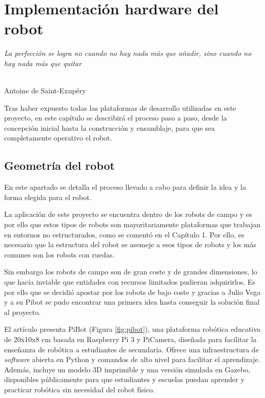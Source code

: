 \chapter{Implementación hardware del robot}
\label{cap:capitulo5}

\begin{flushright}
\begin{minipage}[]{10cm}
\emph{La perfección se logra no cuando no hay nada más que añadir, sino cuando no hay nada más que quitar}\\
\end{minipage}\\

Antoine de Saint-Exupéry\\
\end{flushright}

\vspace{1cm}

Tras haber expuesto todas las plataformas de desarrollo utilizadas en este proyecto, en este capítulo se describirá el proceso paso a paso, desde la concepción inicial hasta la construcción y ensamblaje, para que sea completamente operativo el robot.

\section{Geometría del robot}

En este apartado se detalla el proceso llevado a cabo para definir la idea y la forma elegida para el robot.

La aplicación de este proyecto se encuentra dentro de los robots de campo y es por ello que estos tipos de robots son mayoritariamente plataformas que trabajan en entornos no estructurados, como se comentó en el Capítulo 1. Por ello, es necesario que la estructura del robot se asemeje a esos tipos de robots y los más comunes son los robots con ruedas. 

Sin embargo los robots de campo son de gran coste y de grandes dimensiones, lo que hacía inviable que entidades con recursos limitados pudieran adquirirlos. Es por ello que se decidió apostar por los robots de bajo coste y gracias a Julio Vega y a su Pibot se pudo encontrar una primera idea hasta conseguir la solución final al proyecto. 

El artículo \cite{vega18c} presenta PiBot (Figura \ref{fig:pibot}), una plataforma robótica educativa  de 20x10x8 cm basada en Raspberry Pi 3 y PiCamera, diseñada para facilitar la enseñanza de robótica a estudiantes de secundaria. Ofrece una infraestructura de \textit{software} abierta en Python y comandos de alto nivel para facilitar el aprendizaje. Además, incluye un modelo 3D imprimible y una versión simulada en Gazebo, disponibles públicamente para que estudiantes y escuelas puedan aprender y practicar robótica sin necesidad del robot físico. 

